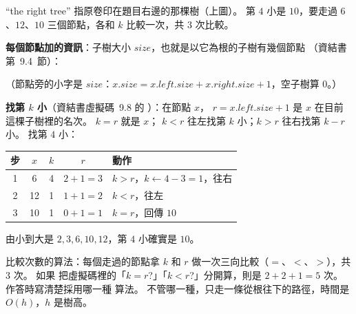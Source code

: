 \begin{pastsoln}
``the right tree'' 指原卷印在題目右邊的那棵樹（上圖）。 第 $4$ 小是 $10$，要走過 $6$、$12$、$10$
三個節點，各和 $k$ 比較一次，共 $3$ 次比較。

\textbf{每個節點加的資訊}：子樹大小 $\mathit{size}$，也就是以它為根的子樹有幾個節點
（資結書第~9.4~節）：
\begin{center}
\end{center}
（節點旁的小字是 $\mathit{size}$：$x.\mathit{size} = x.\mathit{left}.\mathit{size} +
x.\mathit{right}.\mathit{size} + 1$，空子樹算 $0$。）

\textbf{找第 $k$ 小}（資結書虛擬碼~9.8 的 ）：在節點 $x$，
$r = x.\mathit{left}.\mathit{size} + 1$ 是 $x$ 在目前這棵子樹裡的名次。 $k = r$ 就是 $x$；
$k < r$ 往左找第 $k$ 小；$k > r$ 往右找第 $k - r$ 小。 找第 $4$ 小：
\begin{center}
\begin{tabular}{ccccl}
\toprule
步 & $x$ & $k$ & $r$ & 動作 \\
\midrule
1 & 6 & 4 & $2 + 1 = 3$ & $k > r$，$k \gets 4 - 3 = 1$，往右 \\
2 & 12 & 1 & $1 + 1 = 2$ & $k < r$，往左 \\
3 & 10 & 1 & $0 + 1 = 1$ & $k = r$，回傳 $10$ \\
\bottomrule
\end{tabular}
\end{center}
由小到大是 $2, 3, 6, 10, 12$，第 $4$ 小確實是 $10$。

比較次數的算法：每個走過的節點拿 $k$ 和 $r$ 做一次三向比較（$=$、$<$、$>$），共 $3$ 次。 如果
把虛擬碼裡的「$k = r$?」「$k < r$?」分開算，則是 $2 + 2 + 1 = 5$ 次。 作答時寫清楚採用哪一種
算法。 不管哪一種，只走一條從根往下的路徑，時間是 $O(h)$，$h$ 是樹高。
\end{pastsoln}

